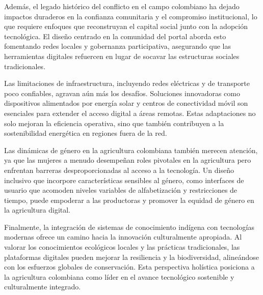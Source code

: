 Además, el legado histórico del conflicto en el campo colombiano ha dejado impactos duraderos en la confianza comunitaria y el compromiso institucional, lo que requiere enfoques que reconstruyan el capital social junto con la adopción tecnológica. El diseño centrado en la comunidad del portal aborda esto fomentando redes locales y gobernanza participativa, asegurando que las herramientas digitales refuercen en lugar de socavar las estructuras sociales tradicionales.

Las limitaciones de infraestructura, incluyendo redes eléctricas y de transporte poco confiables, agravan aún más los desafíos. Soluciones innovadoras como dispositivos alimentados por energía solar y centros de conectividad móvil son esenciales para extender el acceso digital a áreas remotas. Estas adaptaciones no solo mejoran la eficiencia operativa, sino que también contribuyen a la sostenibilidad energética en regiones fuera de la red.

Las dinámicas de género en la agricultura colombiana también merecen atención, ya que las mujeres a menudo desempeñan roles pivotales en la agricultura pero enfrentan barreras desproporcionadas al acceso a la tecnología. Un diseño inclusivo que incorpore características sensibles al género, como interfaces de usuario que acomoden niveles variables de alfabetización y restricciones de tiempo, puede empoderar a las productoras y promover la equidad de género en la agricultura digital.

Finalmente, la integración de sistemas de conocimiento indígena con tecnologías modernas ofrece un camino hacia la innovación culturalmente apropiada. Al valorar los conocimientos ecológicos locales y las prácticas tradicionales, las plataformas digitales pueden mejorar la resiliencia y la biodiversidad, alineándose con los esfuerzos globales de conservación. Esta perspectiva holística posiciona a la agricultura colombiana como líder en el avance tecnológico sostenible y culturalmente integrado.